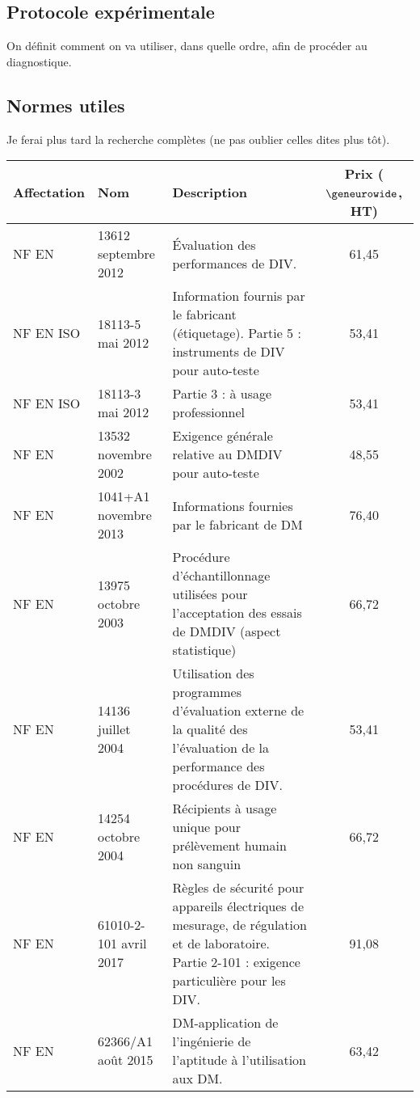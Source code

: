 \documentclass[a4paper,11pt]{article}
\newcounter{pte}
\begin{document}
\begin{sloppypar}
\subsection{Protocole expérimentale}
On définit comment on va utiliser, dans quelle ordre, afin de procéder au diagnostique.

\subsection{Normes utiles}
Je ferai plus tard la recherche complètes (ne pas oublier celles dites plus tôt).
\begin{center}
{
\renewcommand{\arraystretch}{2.5} %

\begin{tabular}{p{2cm}|p{4cm}|p{5cm}|c}
   Affectation & Nom & Description & Prix ($\geneurowide$, HT) \\
   \hline\hline
   NF EN & 13612 septembre 2012 & \'Evaluation des performances de DIV. & 61,45 \\
   NF EN ISO & 18113-5 mai 2012 & Information fournis par le fabricant 
				  (étiquetage). Partie 5 : instruments de DIV pour auto-teste & 53,41 \\
  NF EN ISO & 18113-3 mai 2012 & Partie 3 : à usage professionnel & 53,41 \\
  NF EN & 13532 novembre 2002 & Exigence générale relative au DMDIV pour auto-teste & 48,55 \\
  NF EN & 1041+A1 novembre 2013 & Informations fournies par le fabricant de DM & 76,40 \\
  NF EN & 13975 octobre 2003 & Procédure d'échantillonnage utilisées pour l'acceptation des essais de DMDIV (aspect statistique) & 66,72 \\
  NF EN & 14136 juillet 2004 & Utilisation des programmes d'évaluation externe de la qualité des l'évaluation de la performance des procédures de DIV. & 53,41 \\
  NF EN & 14254 octobre 2004 & Récipients à usage unique pour prélèvement humain non sanguin & 66,72 \\
  NF EN & 61010-2-101 avril 2017 & Règles de sécurité pour appareils électriques de mesurage, de régulation et de laboratoire. Partie 2-101 : exigence particulière pour les DIV. & 91,08 \\
  NF EN & 62366/A1 août 2015 & DM-application de l'ingénierie de l'aptitude à l'utilisation aux DM. & 63,42
  
  \end{tabular}
}
\end{center}


\end{sloppypar}
\end{document}
